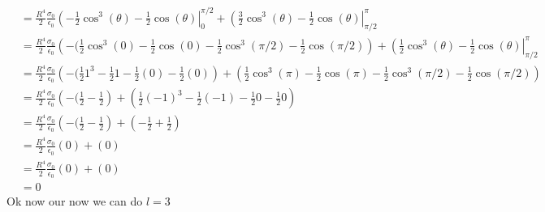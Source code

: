 \documentclass[11pt]{article}
\numberwithin{equation}{section}
\begin{document}
\begin{align*}
&=\frac{R^{4}}{2}\frac{\sigma_0}{\epsilon_0}\left(-\frac{1}{2}\cos^3(\theta)-\frac{1}{2}\cos(\theta)\right|_{0}^{\pi/2} + \left(\frac{3}{2}\cos^3(\theta)-\frac{1}{2}\cos(\theta)\right|_{\pi/2}^{\pi} \\
&=\frac{R^{4}}{2}\frac{\sigma_0}{\epsilon_0}\left(-(\frac{1}{2}\cos^3(0)-\frac{1}{2}\cos(0)-\frac{1}{2}\cos^3(\pi/2)-\frac{1}{2}\cos(\pi/2)\right) + \left(\frac{1}{2}\cos^3(\theta)-\frac{1}{2}\cos(\theta)\right|_{\pi/2}^{\pi} \\
&=\frac{R^{4}}{2}\frac{\sigma_0}{\epsilon_0}\left(-(\frac{1}{2}1^3-\frac{1}{2}1-\frac{1}{2}(0)-\frac{1}{2}(0)\right) + \left(\frac{1}{2}\cos^3(\pi)-\frac{1}{2}\cos(\pi)- \frac{1}{2}\cos^3(\pi/2)-\frac{1}{2}\cos(\pi/2)\right) \\
&=\frac{R^{4}}{2}\frac{\sigma_0}{\epsilon_0}\left(-(\frac{1}{2}-\frac{1}{2}\right) + \left(\frac{1}{2}(-1)^3-\frac{1}{2}(-1)- \frac{1}{2}0 - \frac{1}{2}0\right) \\
&=\frac{R^{4}}{2}\frac{\sigma_0}{\epsilon_0}\left(-(\frac{1}{2}-\frac{1}{2}\right) + \left(-\frac{1}{2}+\frac{1}{2}\right) \\
&=\frac{R^{4}}{2}\frac{\sigma_0}{\epsilon_0}\left(0\right) + \left(0\right) \\
&=\frac{R^{4}}{2}\frac{\sigma_0}{\epsilon_0}\left(0\right) + \left(0\right) \\
&=0
\end{align*}
Ok now our now we can do $l=3$
\end{document}
